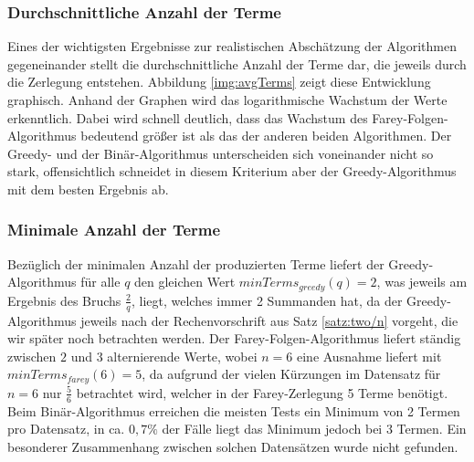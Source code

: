 \subsubsection{Durchschnittliche Anzahl der Terme}
Eines der wichtigsten Ergebnisse zur realistischen Abschätzung der Algorithmen gegeneinander stellt die durchschnittliche Anzahl der Terme dar, die jeweils durch die Zerlegung entstehen. Abbildung \ref{img:avgTerms} zeigt diese Entwicklung graphisch.
Anhand der Graphen wird das logarithmische Wachstum der Werte erkenntlich. Dabei wird schnell deutlich, dass das Wachstum des Farey-Folgen-Algorithmus bedeutend größer ist als das der anderen beiden Algorithmen. Der Greedy- und der Binär-Algorithmus unterscheiden sich voneinander nicht so stark, offensichtlich schneidet in diesem Kriterium aber der Greedy-Algorithmus mit dem besten Ergebnis ab.

\subsubsection{Minimale Anzahl der Terme}
Bezüglich der minimalen Anzahl der produzierten Terme liefert der Greedy-Algorithmus für alle $q$ den gleichen Wert $minTerms_{greedy}(q) = 2$, was jeweils am Ergebnis des Bruchs $\frac{2}{q}$, liegt, welches immer 2 Summanden hat, da der Greedy-Algorithmus jeweils nach der Rechenvorschrift aus Satz \ref{satz:two/n} vorgeht, die wir später noch betrachten werden. Der Farey-Folgen-Algorithmus liefert ständig zwischen $2$ und $3$ alternierende Werte, wobei $n=6$ eine Ausnahme liefert mit $minTerms_{farey}(6) = 5$, da aufgrund der vielen Kürzungen im Datensatz für $n=6$ nur $\frac{5}{6}$ betrachtet wird, welcher in der Farey-Zerlegung 5 Terme benötigt. Beim Binär-Algorithmus erreichen die meisten Tests ein Minimum von 2 Termen pro Datensatz, in ca. $0,7\%$ der Fälle liegt das Minimum jedoch bei 3 Termen. Ein besonderer Zusammenhang zwischen solchen Datensätzen wurde nicht gefunden.

